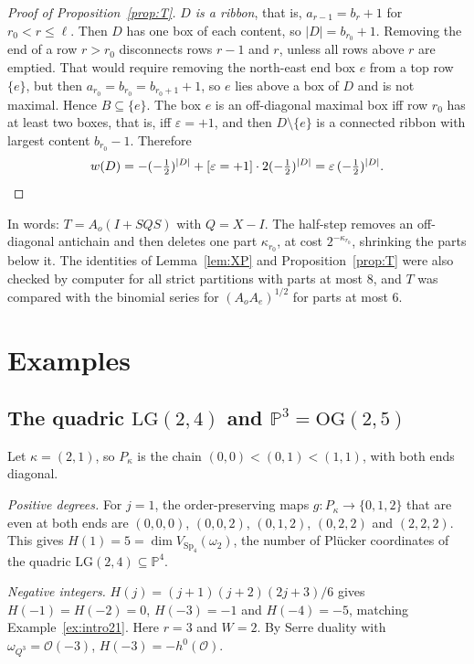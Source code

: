 \documentclass[11pt]{amsart}
\theoremstyle{definition}
\theoremstyle{remark}
\newcommand{\LG}{\mathrm{LG}}
\newcommand{\OG}{\mathrm{OG}}
\newcommand{\cO}{\mathcal{O}}
\begin{document}
\begin{proof}[Proof of Proposition~\ref{prop:T}]
\emph{$D$ is a ribbon}, that is, $a_{r-1}=b_r+1$ for $r_0<r\le\ell$. Then $D$ has one box of each
content, so $|D|=b_{r_0}+1$. Removing the end of a row $r>r_0$ disconnects rows $r-1$ and $r$,
unless all rows above $r$ are emptied. That would require removing the north-east end box $e$
from a top row $\{e\}$, but then $a_{r_0}=b_{r_0}=b_{r_0+1}+1$, so $e$ lies above a box of
$D$ and is not maximal. Hence $B\subseteq\{e\}$. The box $e$ is an off-diagonal maximal box
iff row $r_0$ has at least two boxes, that is, iff $\varepsilon=+1$, and then
$D\setminus\{e\}$ is a connected ribbon with largest content $b_{r_0}-1$. Therefore
\[ w(D)=-(-\tfrac12)^{|D|}+[\varepsilon=+1]\cdot2(-\tfrac12)^{|D|}=\varepsilon\,(-\tfrac12)^{|D|}. \qedhere \]
\end{proof}

In words: $T=A_o(I+SQS)$ with $Q=X-I$. The half-step removes an off-diagonal antichain and then
deletes one part $\kappa_{r_0}$, at cost $2^{-\kappa_{r_0}}$, shrinking the parts below it. The
identities of Lemma~\ref{lem:XP} and Proposition~\ref{prop:T} were also checked by computer
for all strict partitions with parts at most $8$, and $T$ was compared with the binomial
series for $(A_oA_e)^{1/2}$ for parts at most $6$.

\section{Examples}\label{sec:examples}

\subsection{The quadric \texorpdfstring{$\LG(2,4)$}{LG(2,4)} and \texorpdfstring{$\mathbb{P}^3=\OG(2,5)$}{P3 = OG(2,5)}}
Let $\kappa=(2,1)$, so $P_\kappa$ is the chain $(0,0)<(0,1)<(1,1)$, with both ends diagonal.

\emph{Positive degrees.} For $j=1$, the order-preserving maps $g\colon P_\kappa\to\{0,1,2\}$
that are even at both ends are $(0,0,0)$, $(0,0,2)$, $(0,1,2)$, $(0,2,2)$ and $(2,2,2)$. This
gives $H(1)=5=\dim V_{\mathrm{Sp}_4}(\omega_2)$, the number of Plücker coordinates of the
quadric $\LG(2,4)\subseteq\mathbb{P}^4$.

\emph{Negative integers.} $H(j)=(j+1)(j+2)(2j+3)/6$ gives $H(-1)=H(-2)=0$, $H(-3)=-1$ and
$H(-4)=-5$, matching Example~\ref{ex:intro21}. Here $r=3$ and $W=2$. By Serre duality with
$\omega_{Q^3}=\cO(-3)$, $H(-3)=-h^0(\cO)$.
\end{document}

